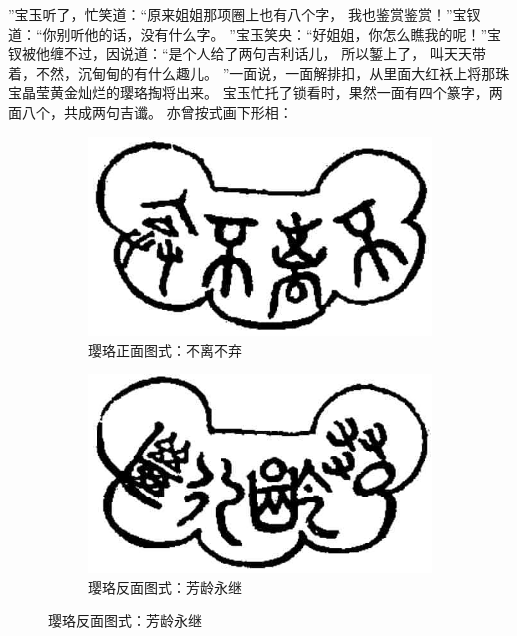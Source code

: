 ”宝玉听了，忙笑道：“原来姐姐那项圈上也有八个字，
我也鉴赏鉴赏！”宝钗道：“你别听他的话，没有什么字。
”宝玉笑央：“好姐姐，你怎么瞧我的呢！”宝钗被他缠不过，因说道：“是个人给了两句吉利话儿，
所以錾上了，
叫天天带着，不然，沉甸甸的有什么趣儿。
”一面说，一面解排扣，从里面大红袄上将那珠宝晶莹黄金灿烂的璎珞掏将出来。
宝玉忙托了锁看时，果然一面有四个篆字，两面八个，共成两句吉谶。
亦曾按式画下形相：\par
\clearpage
\begin{figure}[h]
     \centering
     \caption{宝钗的璎珞（金锁）}
     \begin{subfigure}[b]{0.45\textwidth}
         \centering
         \includegraphics[width=\textwidth]{images/jin-1.JPG}
         \caption*{璎珞正面图式：不离不弃}
     \end{subfigure}
     \hfill
     \begin{subfigure}[b]{0.45\textwidth}
         \centering
         \includegraphics[width=\textwidth]{images/jin-2.JPG}
         \caption*{璎珞反面图式：芳龄永继}
     \end{subfigure}
\end{figure}
